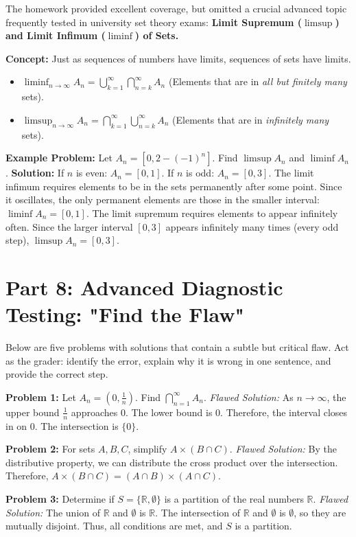 \documentclass[12pt]{article}
\begin{document}
The homework provided excellent coverage, but omitted a crucial advanced topic frequently tested in university set theory exams: \textbf{Limit Supremum ($\limsup$) and Limit Infimum ($\liminf$) of Sets.}

\textbf{Concept:} Just as sequences of numbers have limits, sequences of sets have limits.
\begin{itemize}
    \item $\liminf_{n \to \infty} A_n = \bigcup_{k=1}^\infty \bigcap_{n=k}^\infty A_n$ (Elements that are in \textit{all but finitely many} sets).
    \item $\limsup_{n \to \infty} A_n = \bigcap_{k=1}^\infty \bigcup_{n=k}^\infty A_n$ (Elements that are in \textit{infinitely many} sets).
\end{itemize}

\textbf{Example Problem:} Let $A_n = [0, 2 - (-1)^n]$. Find $\limsup A_n$ and $\liminf A_n$.
\textbf{Solution:}
If $n$ is even: $A_n = [0, 1]$.
If $n$ is odd: $A_n = [0, 3]$.
The limit infimum requires elements to be in the sets permanently after some point. Since it oscillates, the only permanent elements are those in the smaller interval: $\liminf A_n = [0, 1]$.
The limit supremum requires elements to appear infinitely often. Since the larger interval $[0, 3]$ appears infinitely many times (every odd step), $\limsup A_n = [0, 3]$.

\newpage
\section{Part 8: Advanced Diagnostic Testing: "Find the Flaw"}

Below are five problems with solutions that contain a subtle but critical flaw. Act as the grader: identify the error, explain why it is wrong in one sentence, and provide the correct step.

\textbf{Problem 1:} Let $A_n = (0, \frac{1}{n})$. Find $\bigcap_{n=1}^\infty A_n$.
\textit{Flawed Solution:} As $n \to \infty$, the upper bound $\frac{1}{n}$ approaches $0$. The lower bound is $0$. Therefore, the interval closes in on $0$. The intersection is $\{0\}$.

\textbf{Problem 2:} For sets $A, B, C$, simplify $A \times (B \cap C)$.
\textit{Flawed Solution:} By the distributive property, we can distribute the cross product over the intersection. Therefore, $A \times (B \cap C) = (A \cap B) \times (A \cap C)$.

\textbf{Problem 3:} Determine if $S = \{ \mathbb{R}, \emptyset \}$ is a partition of the real numbers $\mathbb{R}$.
\textit{Flawed Solution:} The union of $\mathbb{R}$ and $\emptyset$ is $\mathbb{R}$. The intersection of $\mathbb{R}$ and $\emptyset$ is $\emptyset$, so they are mutually disjoint. Thus, all conditions are met, and $S$ is a partition.
\end{document}
